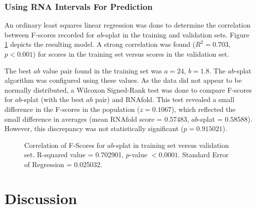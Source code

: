 \documentclass{cshonours}
\begin{document}
\subsection{Using RNA Intervals For Prediction}
An ordinary least squares linear regression was done to determine the correlation between F-scores recorded for $ab$-splat in the training and validation sets. Figure \ref{fig:abcorrelation} depicts the resulting model. A strong correlation was found ($R^2 = 0.703$, $p < 0.001$) for scores in the training set versus scores in the validation set.

The best $ab$ value pair found in the training set was $a = 24$, $b = 1.8$. The $ab$-splat algorithm was configured using these values. As the data did not appear to be normally distributed, a Wilcoxon Signed-Rank test was done to compare F-scores for $ab$-splat (with the best $ab$ pair) and RNAfold. This test revealed a small difference in the F-scores in the population ($z = 0.1067$), which reflected the small difference in averages (mean RNAfold score = $0.57483$, $ab$-splat = $0.58588$). However, this discrepancy was not statistically significant ($p = 0.915021$).


\begin{figure}
\begin{center}
\end{center}
\caption{Correlation of F-Scores for $ab$-splat in training set versus validation set. R-squared value = 0.702901, $p$-value $< 0.0001$. Standard Error of Regression = 0.025032.}
\label{fig:abcorrelation}
\end{figure}

\chapter{Discussion}
\end{document}
